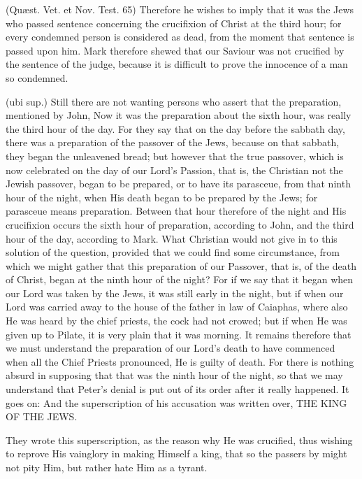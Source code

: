 (Quæst. Vet. et Nov. Test. 65) Therefore he wishes to imply that it was the Jews who passed sentence concerning the crucifixion of Christ at the third hour; for every condemned person is considered as dead, from the moment that sentence is passed upon him. Mark therefore shewed that our Saviour was not crucified by the sentence of the judge, because it is difficult to prove the innocence of a man so condemned.

 (ubi sup.) Still there are not wanting persons who assert that the preparation, mentioned by John, Now it was the preparation about the sixth hour, was really the third hour of the day. For they say that on the day before the sabbath day, there was a preparation of the passover of the Jews, because on that sabbath, they began the unleavened bread; but however that the true passover, which is now celebrated on the day of our Lord’s Passion, that is, the Christian not the Jewish passover, began to be prepared, or to have its parasceue, from that ninth hour of the night, when His death began to be prepared by the Jews; for parasceue means preparation. Between that hour therefore of the night and His crucifixion occurs the sixth hour of preparation, according to John, and the third hour of the day, according to Mark. What Christian would not give in to this solution of the question, provided that we could find some circumstance, from which we might gather that this preparation of our Passover, that is, of the death of Christ, began at the ninth hour of the night? For if we say that it began when our Lord was taken by the Jews, it was still early in the night, but if when our Lord was carried away to the house of the father in law of Caiaphas, where also He was heard by the chief priests, the cock had not crowed; but if when He was given up to Pilate, it is very plain that it was morning. It remains therefore that we must understand the preparation of our Lord’s death to have commenced when all the Chief Priests pronounced, He is guilty of death. For there is nothing absurd in supposing that that was the ninth hour of the night, so that we may understand that Peter’s denial is put out of its order after it really happened. It goes on: And the superscription of his accusation was written over, THE KING OF THE JEWS.

 They wrote this superscription, as the reason why He was crucified, thus wishing to reprove His vainglory in making Himself a king, that so the passers by might not pity Him, but rather hate Him as a tyrant.

